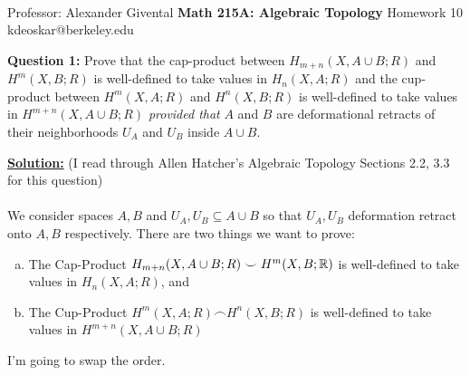 \documentclass[11pt]{article}
\begin{document}
\thispagestyle{empty}
\bigskip \
\vspace{0.1cm}

\begin{center}
{\fontsize{22}{22} \selectfont Professor: Alexander Givental}
\vskip 16pt
{\fontsize{30}{30} \selectfont \bf \sffamily Math 215A: Algebraic Topology}
\vskip 24pt
{\fontsize{14}{14} \selectfont \rmfamily Homework 10} 
\vskip 6pt
{\fontsize{14}{14} \selectfont \ttfamily kdeoskar@berkeley.edu} 
\vskip 24pt
\end{center}





\begin{bluebox}
  \textbf{Question 1:} Prove that the cap-product between $H_{m+n}(X, A \cup B; R)$ and $H^m(X, B; R)$ is well-defined to take values in $H_{n}(X, A; R)$ and the cup-product between $H^m(X, A; R)$ and $H^n(X, B; R)$ is well-defined to take values in $H^{m+n}(X, A \cup B; R)$ \emph{provided that} $A$ and $B$ are deformational retracts of their neighborhoods $U_{A}$ and $U_{B}$ inside $A \cup B$.
\end{bluebox}

\vskip 0.5cm
\textbf{\underline{Solution:}} (I read through Allen Hatcher's Algebraic Topology Sections 2.2, 3.3 for this question)
\\
\\
We consider spaces $A, B$ and $U_A, U_B \subseteq A \cup B$ so that $U_A, U_B$ deformation retract onto $A, B$ respectively. There are two things we want to prove:
\begin{enumerate}[(a)]
  \item The Cap-Product $ H_{m + n}(X, A \cup B; R) \smile H^m(X, B; \mathbb{R}) $ is well-defined to take values in $H_{n}(X,A; R)$, and
  \item The Cup-Product $ H^{m}(X,A; R) \frown H^n(X, B;R) $ is well-defined to take values in $H^{m+n}(X, A \cup B; R)$
\end{enumerate} I'm going to swap the order.
\end{document}
